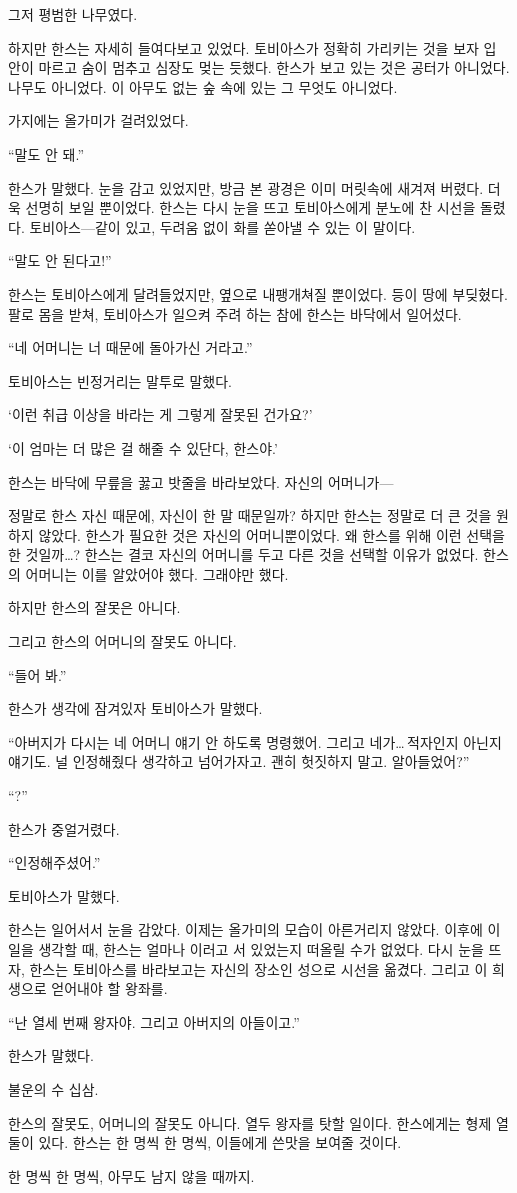 그저 평범한 나무였다.

하지만 한스는 자세히 들여다보고 있었다. 토비아스가 정확히 가리키는 것을 보자 입 안이 마르고 숨이 멈추고 심장도 멎는 듯했다. 한스가 보고 있는 것은 공터가 아니었다. 나무도 아니었다. 이 아무도 없는 숲 속에 있는 그 무엇도 아니었다.

가지에는 올가미가 걸려있었다.

``말도 안 돼.''

한스가 말했다. 눈을 감고 있었지만, 방금 본 광경은 이미 머릿속에 새겨져 버렸다. 더욱 선명히 보일 뿐이었다. 한스는 다시 눈을 뜨고 토비아스에게 분노에 찬 시선을 돌렸다. 토비아스—같이 있고, 두려움 없이 화를 쏟아낼 수 있는 이 말이다.

``말도 안 된다고!''

한스는 토비아스에게 달려들었지만, 옆으로 내팽개쳐질 뿐이었다. 등이 땅에 부딪혔다. 팔로 몸을 받쳐, 토비아스가 일으켜 주려 하는 참에 한스는 바닥에서 일어섰다.

``네 어머니는 너 때문에 돌아가신 거라고.''

토비아스는 빈정거리는 말투로 말했다.

`이런 취급 이상을 바라는 게 그렇게 잘못된 건가요?'

`이 엄마는 더 많은 걸 해줄 수 있단다, 한스야.'

한스는 바닥에 무릎을 꿇고 밧줄을 바라보았다. 자신의 어머니가—

정말로 한스 자신 때문에, 자신이 한 말 때문일까? 하지만 한스는 정말로 더 큰 것을 원하지 않았다. 한스가 필요한 것은 자신의 어머니뿐이었다. 왜 한스를 위해 이런 선택을 한 것일까\ldots? 한스는 결코 자신의 어머니를 두고 다른 것을 선택할 이유가 없었다. 한스의 어머니는 이를 알았어야 했다. 그래야만 했다.

하지만 한스의 잘못은 아니다.

그리고 한스의 어머니의 잘못도 아니다.

``들어 봐.''

한스가 생각에 잠겨있자 토비아스가 말했다. 

``아버지가 다시는 네 어머니 얘기 안 하도록 명령했어. 그리고 네가\ldots\,적자인지 아닌지 얘기도. 널 인정해줬다 생각하고 넘어가자고. 괜히 헛짓하지 말고. 알아들었어?''

``?''

한스가 중얼거렸다.

``인정해주셨어.''

토비아스가 말했다.

한스는 일어서서 눈을 감았다. 이제는 올가미의 모습이 아른거리지 않았다. 이후에 이 일을 생각할 때, 한스는 얼마나 이러고 서 있었는지 떠올릴 수가 없었다. 다시 눈을 뜨자, 한스는 토비아스를 바라보고는 자신의 장소인 성으로 시선을 옮겼다. 그리고 이 희생으로 얻어내야 할 왕좌를.

``난 열세 번째 왕자야. 그리고 아버지의 아들이고.''

한스가 말했다.

불운의 수 십삼.

한스의 잘못도, 어머니의 잘못도 아니다. 열두 왕자를 탓할 일이다. 한스에게는 형제 열둘이 있다. 한스는 한 명씩 한 명씩, 이들에게 쓴맛을 보여줄 것이다.

한 명씩 한 명씩, 아무도 남지 않을 때까지.

